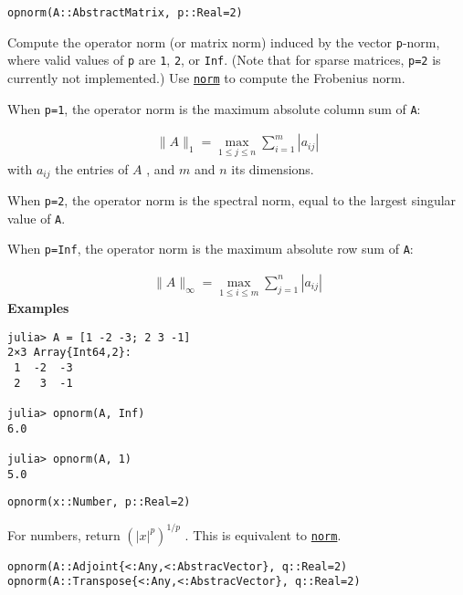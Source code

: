 \begin{adjustwidth}{2em}{0pt}


\begin{verbatim}
opnorm(A::AbstractMatrix, p::Real=2)
\end{verbatim}

Compute the operator norm (or matrix norm) induced by the vector \texttt{p}-norm, where valid values of \texttt{p} are \texttt{1}, \texttt{2}, or \texttt{Inf}. (Note that for sparse matrices, \texttt{p=2} is currently not implemented.) Use \hyperlink{898926013064269707}{\texttt{norm}} to compute the Frobenius norm.

When \texttt{p=1}, the operator norm is the maximum absolute column sum of \texttt{A}:

\begin{equation*}
\begin{split}\|A\|_1 = \max_{1 ≤ j ≤ n} \sum_{i=1}^m | a_{ij} |\end{split}\end{equation*}
with  \(a_{ij}\)  the entries of  \(A\) , and  \(m\)  and  \(n\)  its dimensions.

When \texttt{p=2}, the operator norm is the spectral norm, equal to the largest singular value of \texttt{A}.

When \texttt{p=Inf}, the operator norm is the maximum absolute row sum of \texttt{A}:

\begin{equation*}
\begin{split}\|A\|_\infty = \max_{1 ≤ i ≤ m} \sum _{j=1}^n | a_{ij} |\end{split}\end{equation*}
\textbf{Examples}


\begin{verbatim}
julia> A = [1 -2 -3; 2 3 -1]
2×3 Array{Int64,2}:
 1  -2  -3
 2   3  -1

julia> opnorm(A, Inf)
6.0

julia> opnorm(A, 1)
5.0
\end{verbatim}




\begin{lstlisting}
opnorm(x::Number, p::Real=2)
\end{lstlisting}

For numbers, return  \(\left( |x|^p \right)^{1/p}\) . This is equivalent to \hyperlink{898926013064269707}{\texttt{norm}}.




\begin{lstlisting}
opnorm(A::Adjoint{<:Any,<:AbstracVector}, q::Real=2)
opnorm(A::Transpose{<:Any,<:AbstracVector}, q::Real=2)
\end{lstlisting}


\end{adjustwidth}
